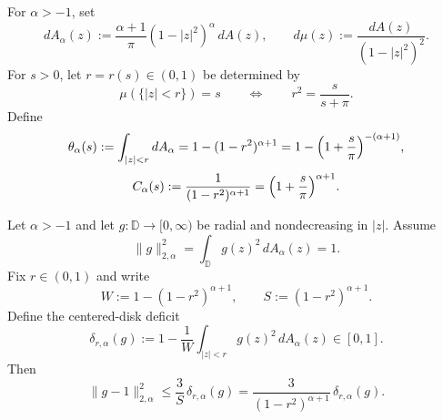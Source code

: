 \documentclass[a4paper,10pt]{amsart}
\newcommand{\D}{\mathbb{D}}
\begin{document}

For $\alpha>-1$, set
\[
dA_\alpha(z):=\frac{\alpha+1}{\pi}(1-|z|^2)^\alpha\,dA(z),
\qquad
d\mu(z):=\frac{dA(z)}{(1-|z|^2)^2}.
\]
For $s>0$, let $r=r(s)\in(0,1)$ be determined by
\[
\mu(\{|z|<r\})=s
\qquad\Longleftrightarrow\qquad
r^2=\frac{s}{s+\pi}.
\]
Define
\[
\theta_\alpha(s):=\int_{|z|<r} dA_\alpha
=1-(1-r^2)^{\alpha+1}
=1-\Bigl(1+\frac{s}{\pi}\Bigr)^{-(\alpha+1)},
\]
\[
C_\alpha(s):=\frac{1}{(1-r^2)^{\alpha+1}}
=\Bigl(1+\frac{s}{\pi}\Bigr)^{\alpha+1}.
\]


\begin{numlemma}
\label{lem:centered_disk_radial}
Let $\alpha>-1$ and let $g:\D\to[0,\infty)$ be radial and nondecreasing in $|z|$.
Assume
\[
\|g\|_{2,\alpha}^2=\int_{\D} g(z)^2\,dA_\alpha(z)=1.
\]
Fix $r\in(0,1)$ and write
\[
W:=1-(1-r^2)^{\alpha+1},
\qquad
S:=(1-r^2)^{\alpha+1}.
\]
Define the centered-disk deficit
\[
\delta_{r,\alpha}(g)
:=1-\frac{1}{W}\int_{|z|<r} g(z)^2\,dA_\alpha(z)\in[0,1].
\]
Then
\[
\|g-1\|_{2,\alpha}^2
\le \frac{3}{S}\,\delta_{r,\alpha}(g)
=\frac{3}{(1-r^2)^{\alpha+1}}\,\delta_{r,\alpha}(g).
\]
\end{numlemma}
\end{document}
